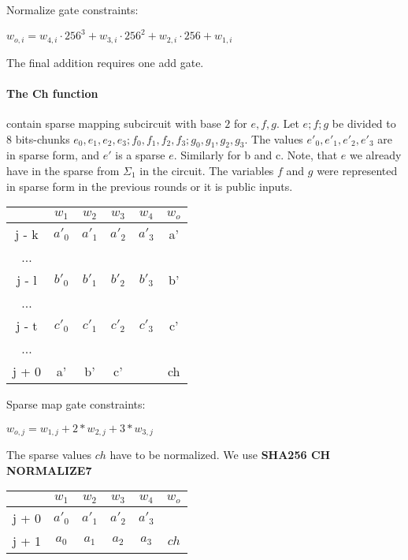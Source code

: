 Normalize gate constraints:
\begin{center}
    $w_{o,i} = w_{4,i} \cdot 256^3 + w_{3,i} \cdot 256^2 + w_{2,i} \cdot 256 + w_{1,i}$ \\
\end{center}

The final addition requires one add gate.

\paragraph{The Ch function}
contain sparse mapping subcircuit with base $2$ for $e, f ,g$.
Let $e; f; g$ be divided to 8 bits-chunks $e_0, e_1, e_2, e_3; f_0, f_1, f_2, f_3; g_0, g_1, g_2, g_3$.
The values $e'_0, e'_1, e'_2, e'_3$ are in sparse form, and $e'$ is a sparse $e$.
Similarly for b and c.
Note, that $e$ we already have in the sparse from $\Sigma_1$ in the circuit.
The variables $f$ and $g$ were represented in sparse form in the previous rounds or it is public inputs.
\begin{center}
    \begin{tabular}{ c|c|c|c|c|c }
        & $w_1$  & $w_2$  & $w_3$  & $w_4$  & $w_o$ \\
        \hline
        j - k & $a'_0$ & $a'_1$ & $a'_2$ & $a'_3$ & a'    \\
        ... & & & & \\
        j - l & $b'_0$ & $b'_1$ & $b'_2$ & $b'_3$ & b'    \\
        ... & & & & \\
        j - t & $c'_0$ & $c'_1$ & $c'_2$ & $c'_3$ & c'    \\
        ... & & & & \\
        j + 0 & a'     & b'     & c'     &        & ch    \\
    \end{tabular}
\end{center}
Sparse map gate constraints:
\begin{center}
    $w_{o, j} = w_{1,j} + 2*w_{2, j} + 3*w_{3, j}$ \\
\end{center}

The sparse values $ch$ have to be normalized.
We use \textbf{SHA256 CH NORMALIZE7}
\begin{center}
    \begin{tabular}{ c|c|c|c|c|c }
        & $w_1$  & $w_2$  & $w_3$  & $w_4$  & $w_o$ \\
        \hline
        j + 0 & $a'_0$ & $a'_1$ & $a'_2$ & $a'_3$ &       \\
        j + 1 & $a_0$  & $ a_1$ & $a_2$  & $a_3$  & $ch$  \\
    \end{tabular}
\end{center}

